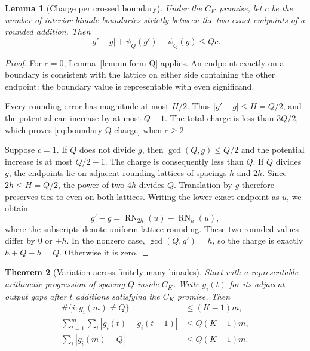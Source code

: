 \documentclass[11pt,reqno]{amsart}
\newtheorem{theorem}{Theorem}[section]
\newtheorem{lemma}[theorem]{Lemma}
\theoremstyle{definition}
\theoremstyle{remark}
\numberwithin{equation}{section}
\DeclareMathOperator{\RN}{RN}
\begin{document}
\begin{lemma}[Charge per crossed boundary]
\label{lem:crossing-Q}
Under the $C_K$ promise, let $c$ be the number of interior binade boundaries
strictly between the two exact endpoints of a rounded addition. Then
\begin{equation}
\label{eq:boundary-Q-charge}
 |g'-g|+\psi_Q(g')-\psi_Q(g)\leq Qc.
\end{equation}
\end{lemma}

\begin{proof}
For $c=0$, Lemma~\ref{lem:uniform-Q} applies. An endpoint exactly on a
boundary is consistent with the lattice on either side containing the other
endpoint: the boundary value is representable with even significand.

Every rounding error has magnitude at most $H/2$. Thus $|g'-g|\leq H=Q/2$,
and the potential can increase by at most $Q-1$. The total charge is less
than $3Q/2$, which proves \eqref{eq:boundary-Q-charge} when $c\geq2$.

Suppose $c=1$. If $Q$ does not divide $g$, then $\gcd(Q,g)\leq Q/2$ and
the potential increase is at most $Q/2-1$. The charge is consequently less
than $Q$. If $Q$ divides $g$, the endpoints lie on adjacent rounding
lattices of spacings $h$ and $2h$. Since $2h\leq H=Q/2$, the power of two
$4h$ divides $Q$. Translation by $g$ therefore preserves ties-to-even on
both lattices. Writing the lower exact endpoint as $u$, we obtain
\[
 g'-g=\RN_{2h}(u)-\RN_h(u),
\]
where the subscripts denote uniform-lattice rounding. These two rounded
values differ by $0$ or $\pm h$. In the nonzero case,
$\gcd(Q,g')=h$, so the charge is exactly $h+Q-h=Q$. Otherwise it is zero.
\end{proof}

\begin{samepage}
\begin{theorem}[Variation across finitely many binades]
\label{thm:multibinade-variation}
Start with a representable arithmetic progression of spacing $Q$ inside
$C_K$. Write $g_i(t)$ for its adjacent output gaps after $t$ additions
satisfying the $C_K$ promise. Then
\begin{align}
 \#\{i:g_i(m)\neq Q\}&\leq (K-1)m,\label{eq:multi-support}\\
 \sum_{t=1}^m\sum_i|g_i(t)-g_i(t-1)|&\leq Q(K-1)m,\label{eq:multi-history}\\
 \sum_i|g_i(m)-Q|&\leq Q(K-1)m.\label{eq:multi-final}
\end{align}
\end{theorem}
\end{samepage}
\end{document}
